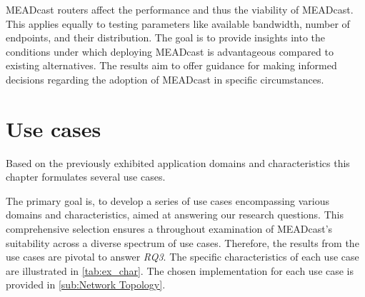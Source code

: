 \begin{enumerate}
            MEADcast routers affect the performance and thus the viability of
            MEADcast.
        This applies equally to testing parameters like available bandwidth,
            number of endpoints, and their distribution.
        The goal is to provide insights into the conditions under which
            deploying MEADcast is advantageous compared to existing
            alternatives.
        The results aim to offer guidance for making informed decisions
            regarding the adoption of MEADcast in specific circumstances.
\end{enumerate}


\section{Use cases} %
\label{sec:Use cases}





Based on the previously exhibited application domains and characteristics this
    chapter formulates several use cases.

The primary goal is, to develop a series of use cases encompassing various
    domains and characteristics, aimed at answering our research questions.
This comprehensive selection ensures a throughout examination of MEADcast's
    suitability across a diverse spectrum of use cases.
Therefore, the results from the use cases are pivotal to answer \textit{RQ3}.
The specific characteristics of each use case are illustrated in
    \autoref{tab:ex_char}.
The chosen implementation for each use case is provided in
    \autoref{sub:Network Topology}.

